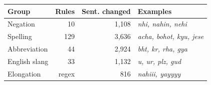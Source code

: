 \begin{tabular}{lrrl}
\toprule
Group & Rules & Sent. changed & Examples\\
\midrule
Negation & 10 & 1,108 & \emph{nhi, nahin, nehi}\\
Spelling & 129 & 3,636 & \emph{acha, bohot, kyu, jese}\\
Abbreviation & 44 & 2,924 & \emph{bht, kr, rha, gya}\\
English slang & 33 & 1,132 & \emph{u, ur, plz, gud}\\
Elongation & regex & 816 & \emph{nahiii, yayyyy}\\
\bottomrule
\end{tabular}
